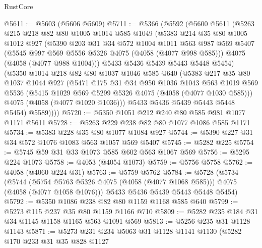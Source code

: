 \begin{lexlean}{RustCore}
\begin{coremodule}
@5611 := @5603 (@5606 @5609)
@5711 := @5366
    (@5592
      (@5600
        @5611
        (@5263
          @215
          @218
          @82
          @80
          @1005
          @1014
          @585
          @1049
          (@5383
            @214
            @35
            @80
            @1005
            @1012
            @927
            (@5390
              @203
              @31
              @34
              @572
              @1004
              @1011
              @563
              @987
              @569
              @5407
              (@5545 @997 @569 @5556 @5326 @4075 (@4058 (@4077 @998 @585)))
              @4075
              (@4058 (@4077 @988 @1004)))
            @5433
            @5436
            @5439
            @5443
            @5448
            @5454)
          (@5350
            @1014
            @218
            @82
            @80
            @1037
            @1046
            @585
            @640
            (@5383
              @217
              @35
              @80
              @1037
              @1044
              @927
              (@5471
                @175
                @31
                @34
                @950
                @1036
                @1043
                @563
                @1019
                @569
                @5536
                (@5415 @1029 @569 @5299 @5326 @4075 (@4058 (@4077 @1030 @585)))
                @4075
                (@4058 (@4077 @1020 @1036)))
              @5433
              @5436
              @5439
              @5443
              @5448
              @5454)
            @5589))))
@5720 := @5350 @1051 @212 @240 @80 @585 @981 @1077 @1171 @5611
@5728 := @5263 @229 @238 @82 @80 @1077 @1086 @585 @1171
@5734 := @5383 @228 @35 @80 @1077 @1084 @927
@5744 := @5390 @227 @31 @34 @572 @1076 @1083 @563 @1057 @569 @5407
@5745 := @5282 @225
@5754 := @5745 @59 @31 @33 @1073 @585 @602 @563 @1067 @569
@5756 := @5295 @224 @1073
@5758 := @4053 (@4054 @1073)
@5759 := @5756 @5758
@5762 := @4058 (@4060 @224 @31)
@5763 := @5759 @5762
@5784 := @5728
    (@5734
      (@5744 (@5754 @5763 @5326 @4075 (@4058 (@4077 @1068 @585))) @4075 (@4058 (@4077 @1058 @1076)))
      @5433
      @5436
      @5439
      @5443
      @5448
      @5454)
@5792 := @5350 @1086 @238 @82 @80 @1159 @1168 @585 @640
@5799 := @5273 @115 @237 @35 @80 @1159 @1166 @710
@5809 := @5282 @235 @184 @31 @34 @1145 @1158 @1165 @563 @1091 @569
@5813 := @5256 @235 @31 @1128 @1143
@5871 := @5273
    @231
    @234
    @5063
    @31
    @1128
    @1141
    @1130
    (@5282
      @170
      @233
      @31
      @35
      @828
      @1127

\end{coremodule}
\end{lexlean}

